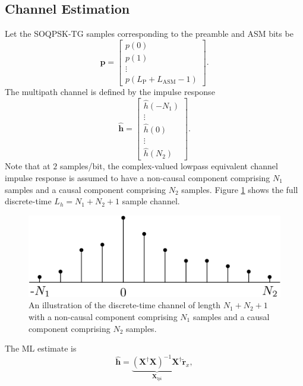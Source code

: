 \subsection{Channel Estimation}
\label{sec:channel_estimation}
Let the SOQPSK-TG samples corresponding to the preamble and ASM bits be
\begin{equation}
\mathbf{p} = 
\begin{bmatrix}
p(0) \\
p(1) \\
\vdots \\
p(L_\text{P} + L_\text{ASM}-1)
\end{bmatrix}.
\label{eq:preamble_ASM}
\end{equation}
The multipath channel is defined by the impulse response 
\begin{equation}
\mathbf{\hat{h}} = 
\begin{bmatrix}
\hat{h}(-N_1) \\ \vdots \\ \hat{h}(0) \\ \vdots \\ \hat{h}(N_2)
\end{bmatrix}.
\end{equation}
Note that at $2$ samples/bit, the complex-valued lowpass equivalent channel impulse response is assumed to have a non-causal component comprising $N_1$ samples and a causal component comprising $N_2$ samples.
Figure \ref{fig:channelExample} shows the full discrete-time $L_h = N_1+N_2+1$ sample channel.
\begin{figure}
	\centering\includegraphics[width=5.5in/100*55]{figures/intro/channelExample.pdf}
	\caption{An illustration of the discrete-time channel of length $N_1+N_2+1$ with a non-causal component comprising $N_1$ samples and a causal component comprising $N_2$ samples.}
	\label{fig:channelExample}
\end{figure} \newline
The ML estimate is \cite[eq. 8]{rice-afran-saquib-cole-rhodes-moazzami:2014} 
\begin{equation}
\hat{\mathbf{h}} = \underbrace{ \left( \mathbf{X}^\dag\mathbf{X} \right)^{-1} \mathbf{X}^\dag}_{\mathbf{X}_\text{lpi}}\tilde{\mathbf{r}}_x,
\end{equation}
